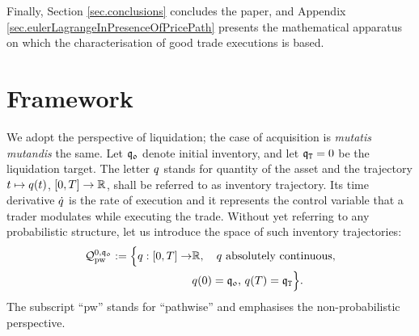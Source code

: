 \documentclass[10pt,a4paper]{article}
\begin{document}
Finally, Section \ref{sec.conclusions} concludes the paper, and  Appendix \ref{sec.eulerLagrangeInPresenceOfPricePath} presents the mathematical apparatus on which the characterisation of good trade executions is based. 




\section{Framework} \label{sec.framework}
We adopt the perspective of liquidation; the case of acquisition is \emph{mutatis mutandis} the same. Let $\mathfrak{q_0}$ denote initial inventory, and let $\mathfrak{q}_{\mathtt{T} }=0$ be the liquidation target. The letter $q$ stands for quantity of the asset and the trajectory $t\mapsto q(t)$, ${[0,T]} \rightarrow \mathbb{R}$, shall be referred to as inventory trajectory. Its time derivative $\dot{q}$ is the rate of execution and it represents the control variable that a trader modulates while executing the trade. Without yet referring to any probabilistic structure, let us introduce the space of such inventory trajectories:
\begin{equation*}
\begin{split}
\mathcal{Q}^{0,\mathfrak{q_0}}_{\text{pw}} := \Big\lbrace
q:{[0,T]}\rightarrow & \mathbb{R},  \quad  q \text{ absolutely continuous},\\ &  q(0) = \mathfrak{q_0}, \, q(T) = \mathfrak{q}_{\mathtt{T} }\Big\rbrace.
\end{split}
\end{equation*}
The subscript ``pw'' stands for ``pathwise'' and emphasises the  non-probabilistic perspective. 

%	
\end{document}
